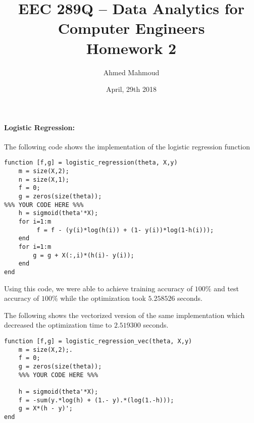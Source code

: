 \documentclass[12pt] {article}
\begin{document}
\title{EEC 289Q – Data Analytics for Computer Engineers \\ Homework 2}
\author{Ahmed Mahmoud}
\date{April, 29th 2018} 

\maketitle






\paragraph{Logistic Regression:} 
The following code shows the implementation of the logistic regression function
\begin{lstlisting}
function [f,g] = logistic_regression(theta, X,y)
	m = size(X,2);
	n = size(X,1);  
	f = 0;
	g = zeros(size(theta));
%%% YOUR CODE HERE %%%
	h = sigmoid(theta'*X);
	for i=1:m
   		 f = f - (y(i)*log(h(i)) + (1- y(i))*log(1-h(i)));
	end
	for i=1:m
    	g = g + X(:,i)*(h(i)- y(i));
	end
end	
\end{lstlisting}

Using this code, we were able to achieve training accuracy of $100\%$ and 
test accuracy of $100\%$ while the optimization took $5.258526 $ seconds.

The following shows the vectorized version of the same implementation which decreased the optimization time to $2.519300$ seconds. 

\begin{lstlisting}
function [f,g] = logistic_regression_vec(theta, X,y)
	m = size(X,2);.
	f = 0;
	g = zeros(size(theta));
	%%% YOUR CODE HERE %%%
	
	h = sigmoid(theta'*X);
	f = -sum(y.*log(h) + (1.- y).*(log(1.-h)));
	g = X*(h - y)';
end 
\end{lstlisting}
\newpage
\end{document}
